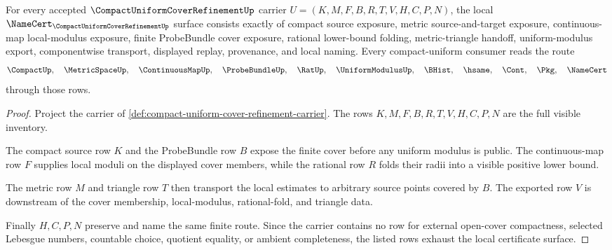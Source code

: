 \begin{theorem}
\label{thm:compact-uniform-cover-refinement-namecert-obligations}
For every accepted $\CompactUniformCoverRefinementUp$ carrier $U=(K,M,F,B,R,T,V,H,C,P,N)$, the local $\NameCert_{\CompactUniformCoverRefinementUp}$ surface consists exactly of compact source exposure, metric source-and-target exposure, continuous-map local-modulus exposure, finite ProbeBundle cover exposure, rational lower-bound folding, metric-triangle handoff, uniform-modulus export, componentwise transport, displayed replay, provenance, and local naming. Every compact-uniform consumer reads the route
$$
\CompactUp,\quad \MetricSpaceUp,\quad \ContinuousMapUp,\quad \ProbeBundleUp,\quad \RatUp,\quad \UniformModulusUp,\quad \BHist,\quad \hsame,\quad \Cont,\quad \Pkg,\quad \NameCert
$$
through those rows.
\end{theorem}
\begin{proof}
Project the carrier of \autoref{def:compact-uniform-cover-refinement-carrier}. The rows $K,M,F,B,R,T,V,H,C,P,N$ are the full visible inventory.

The compact source row $K$ and the ProbeBundle row $B$ expose the finite cover before any uniform modulus is public. The continuous-map row $F$ supplies local moduli on the displayed cover members, while the rational row $R$ folds their radii into a visible positive lower bound.

The metric row $M$ and triangle row $T$ then transport the local estimates to arbitrary source points covered by $B$. The exported row $V$ is downstream of the cover membership, local-modulus, rational-fold, and triangle data.

Finally $H,C,P,N$ preserve and name the same finite route. Since the carrier contains no row for external open-cover compactness, selected Lebesgue numbers, countable choice, quotient equality, or ambient completeness, the listed rows exhaust the local certificate surface.
\end{proof}

